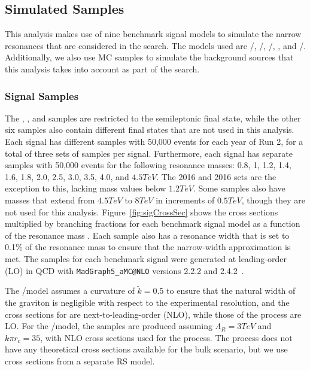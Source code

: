 \subsection{Simulated Samples}
\label{sec:simSamples}

This analysis makes use of nine benchmark signal models to simulate the narrow resonances that are considered in the search.
The models used are \ggF/\VBF\GBulktoWWtolnuqqbarpr, \ggF/\VBF\RadtoWWtolnuqqbarpr, \DY/\VBF\WprtoWZtolnuqqbar, \DY\WprtoWHtolnubbbar, and \DY/\VBF\ZprtoWWtolnuqqbarpr.
Additionally, we also use MC samples to simulate the background sources that this analysis takes into account as part of the search.

\subsubsection{Signal Samples}

The \DY\WprtoWH, \DY\WprtoWZ, and \ggF\GBulktoWW samples are restricted to the semileptonic final state, while the other six samples also contain different final states that are not used in this analysis.
Each signal has different samples with 50,000 events for each year of Run 2, for a total of three sets of samples per signal.
Furthermore, each signal has separate samples with 50,000 events for the following resonance masses: 0.8, 1, 1.2, 1.4, 1.6, 1.8, 2.0, 2.5, 3.0, 3.5, 4.0, and $4.5\unit{TeV}$.
The 2016 \VBF\ZprtoWW and 2016 \VBF\WprtoWZ sets are the exception to this, lacking mass values below $1.2\unit{TeV}$.
Some samples also have masses that extend from $4.5\unit{TeV}$ to $8\unit{TeV}$ in increments of $0.5\unit{TeV}$, though they are not used for this analysis.
Figure~\ref{fig:sigCrossSec} shows the cross sections multiplied by branching fractions for each benchmark signal model as a function of the resonance mass \MX.
Each sample also has a resonance width that is set to 0.1\% of the resonance mass to ensure that the narrow-width approximation is met.
The samples for each benchmark signal were generated at leading-order (LO) in QCD with \texttt{MadGraph5\_aMC@NLO} versions 2.2.2 and 2.4.2~\cite{Alwall_2014}.

The \ggF/\VBF\GBulktoWW model assumes a curvature of $\tilde{k}=0.5$ to ensure that the natural width of the graviton is negligible with respect to the experimental resolution, and the cross sections for \ggF\GBulktoWW are next-to-leading-order (NLO), while those of the \VBF process are LO.
For the \ggF/\VBF\RadtoWW model, the samples are produced assuming $\Lambda_{R}=3\unit{TeV}$ and $k\pi r_c=35$, with NLO cross sections used for the \ggF process.
The \VBF process does not have any theoretical cross sections available for the bulk scenario, but we use cross sections from a separate RS model.

